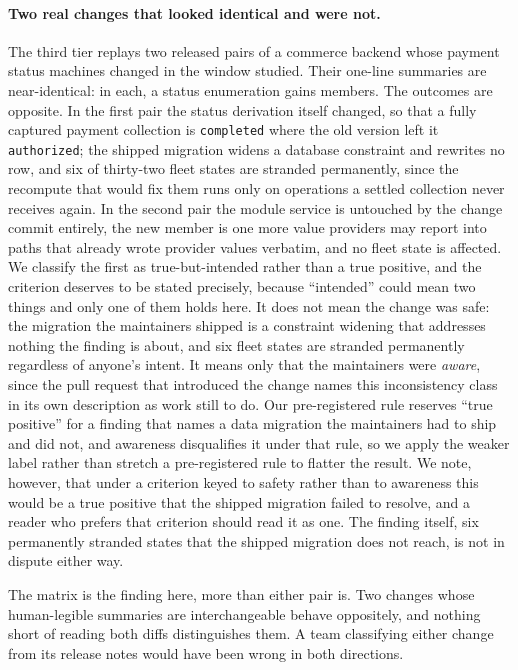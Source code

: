 \documentclass[11pt]{article}
\newcommand{\code}[1]{\texttt{#1}}
\begin{document}
\paragraph{Two real changes that looked identical and were not.} The third tier
replays two released pairs of a commerce backend whose payment status machines
changed in the window studied. Their one-line summaries are near-identical: in
each, a status enumeration gains members. The outcomes are opposite. In the first
pair the status derivation itself changed, so that a fully captured payment
collection is \code{completed} where the old version left it \code{authorized};
the shipped migration widens a database constraint and rewrites no row, and six
of thirty-two fleet states are stranded permanently, since the recompute that
would fix them runs only on operations a settled collection never receives
again. In the second pair the module service is untouched by the change commit
entirely, the new member is one more value providers may report into paths that
already wrote provider values verbatim, and no fleet state is affected. We
classify the first as true-but-intended rather than a true positive, and the
criterion deserves to be stated precisely, because ``intended'' could mean two
things and only one of them holds here. It does not mean the change was safe: the
migration the maintainers shipped is a constraint widening that addresses nothing
the finding is about, and six fleet states are stranded permanently regardless of
anyone's intent. It means only that the maintainers were \emph{aware}, since the
pull request that introduced the change names this inconsistency class in its own
description as work still to do. Our pre-registered rule reserves ``true
positive'' for a finding that names a data migration the maintainers had to ship
and did not, and awareness disqualifies it under that rule, so we apply the weaker
label rather than stretch a pre-registered rule to flatter the result. We note,
however, that under a criterion keyed to safety rather than to awareness this
would be a true positive that the shipped migration failed to resolve, and a
reader who prefers that criterion should read it as one. The finding itself, six
permanently stranded states that the shipped migration does not reach, is not in
dispute either way.

The matrix is the finding here, more than either pair is. Two changes whose
human-legible summaries are interchangeable behave oppositely, and nothing short
of reading both diffs distinguishes them. A team classifying either change from
its release notes would have been wrong in both directions.
\end{document}
